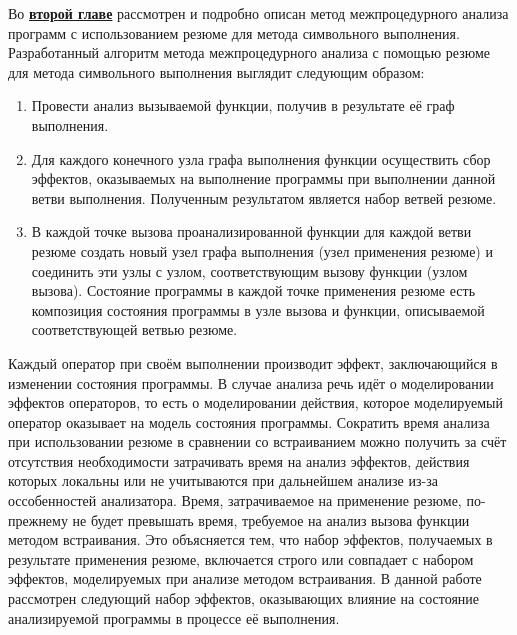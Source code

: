 Во \underline{\textbf{второй главе}} рассмотрен и подробно описан метод межпроцедурного анализа программ с использованием резюме для метода символьного выполнения. Разработанный алгоритм метода межпроцедурного анализа с помощью резюме для метода символьного выполнения выглядит следующим образом:

\begin{enumerate}
 \item Провести анализ вызываемой функции, получив в результате её граф выполнения.
 \item Для каждого конечного узла графа выполнения функции осуществить сбор эффектов, оказываемых на выполнение программы при выполнении данной ветви выполнения. Полученным результатом является набор ветвей резюме.
 \item В каждой точке вызова проанализированной функции для каждой ветви резюме создать новый узел графа выполнения (узел применения резюме) и соединить эти узлы с узлом, соответствующим вызову функции (узлом вызова). Состояние программы в каждой точке применения резюме есть композиция состояния программы в узле вызова и функции, описываемой соответствующей ветвью резюме.
\end{enumerate}

Каждый оператор при своём выполнении производит эффект, заключающийся в изменении состояния программы. В случае анализа речь идёт о моделировании эффектов операторов, то есть о моделировании действия, которое моделируемый оператор оказывает на модель состояния программы. Сократить время анализа при использовании резюме в сравнении со встраиванием можно получить за счёт отсутствия необходимости затрачивать время на анализ эффектов, действия которых локальны или не учитываются при дальнейшем анализе из-за оссобенностей анализатора. Время, затрачиваемое на применение резюме, по-прежнему не будет превышать время, требуемое на анализ вызова функции методом встраивания. Это объясняется тем, что набор эффектов, получаемых в результате применения резюме, включается строго или совпадает с набором эффектов, моделируемых при анализе методом встраивания. В данной работе рассмотрен следующий набор эффектов, оказывающих влияние на состояние анализируемой программы в процессе её выполнения.

